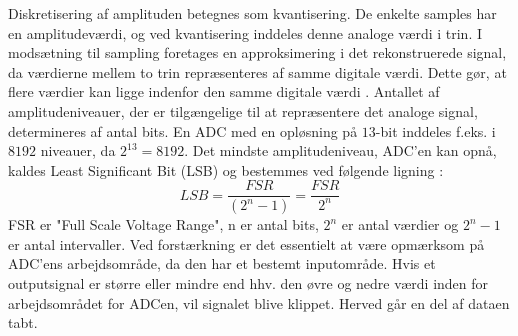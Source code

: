 Diskretisering af amplituden betegnes som kvantisering. De enkelte samples har en amplitudeværdi, og ved kvantisering inddeles denne analoge værdi i trin. I modsætning til sampling foretages en approksimering i det rekonstruerede signal, da værdierne mellem to trin repræsenteres af samme digitale værdi. Dette gør, at flere værdier kan ligge indenfor den samme digitale værdi \cite{Zouridakis2003}. Antallet af amplitudeniveauer, der er tilgængelige til at repræsentere det analoge signal, determineres af antal bits. En ADC med en opløsning på $13$-bit inddeles f.eks. i $8192$ niveauer, da $2^{13}=8192$. \cite{Konrad2006} Det mindste amplitudeniveau, ADC'en kan opnå, kaldes Least Significant Bit (LSB) og bestemmes ved følgende ligning \cite{webster2009,Wolf2004,Aminoff2012}:
\begin{equation}\label{ligningLSB}
LSB = \frac{FSR}{(2^{n}-1)} = \frac{FSR}{2^{n}}
\end{equation}
FSR er "Full Scale Voltage Range", n er antal bits, $2^n$ er antal værdier og $2^{n}-1$ er antal intervaller. 
\noindent Ved forstærkning er det essentielt at være opmærksom på ADC'ens arbejdsområde, da den har et bestemt inputområde. Hvis et outputsignal er større eller mindre end hhv. den øvre og nedre værdi inden for arbejdsområdet for ADCen, vil signalet blive klippet. Herved går en del af dataen tabt. \cite{webster2009,Wolf2004,Aminoff2012}